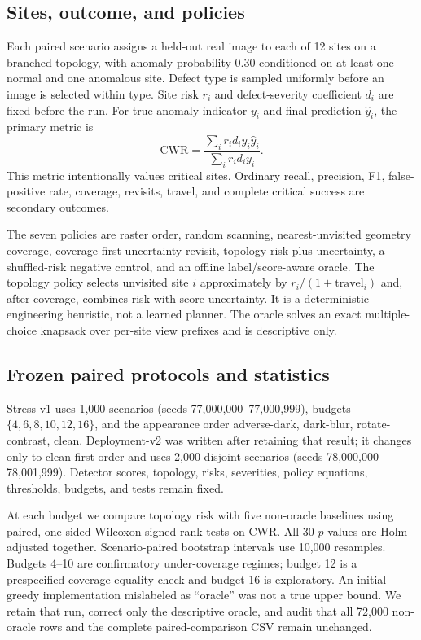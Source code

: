 \documentclass[journal]{IEEEtran}
\begin{document}
\subsection{Sites, outcome, and policies}

Each paired scenario assigns a held-out real image to each of 12 sites on a
branched topology, with anomaly probability 0.30 conditioned on at least one
normal and one anomalous site.  Defect type is sampled uniformly before an
image is selected within type.  Site risk $r_i$ and defect-severity coefficient
$d_i$ are fixed before the run.  For true anomaly indicator $y_i$ and final
prediction $\hat y_i$, the primary metric is
\begin{equation}
 \mathrm{CWR}=\frac{\sum_i r_i d_i y_i\hat y_i}
                    {\sum_i r_i d_i y_i}.
\end{equation}
This metric intentionally values critical sites.  Ordinary recall, precision,
F1, false-positive rate, coverage, revisits, travel, and complete critical
success are secondary outcomes.

The seven policies are raster order, random scanning, nearest-unvisited geometry
coverage, coverage-first uncertainty revisit, topology risk plus uncertainty,
a shuffled-risk negative control, and an offline label/score-aware oracle.  The
topology policy selects unvisited site $i$ approximately by
$r_i/(1+\mathrm{travel}_i)$ and, after coverage, combines risk with score
uncertainty.  It is a deterministic engineering heuristic, not a learned
planner.  The oracle solves an exact multiple-choice knapsack over per-site view
prefixes and is descriptive only.

\subsection{Frozen paired protocols and statistics}

Stress-v1 uses 1,000 scenarios (seeds 77,000,000--77,000,999), budgets
$\{4,6,8,10,12,16\}$, and the appearance order adverse-dark, dark-blur,
rotate-contrast, clean.  Deployment-v2 was written after retaining that result;
it changes only to clean-first order and uses 2,000 disjoint scenarios (seeds
78,000,000--78,001,999).  Detector scores, topology, risks, severities, policy
equations, thresholds, budgets, and tests remain fixed.

At each budget we compare topology risk with five non-oracle baselines using
paired, one-sided Wilcoxon signed-rank tests on CWR.  All 30 $p$-values are Holm
adjusted together.  Scenario-paired bootstrap intervals use 10,000 resamples.
Budgets 4--10 are confirmatory under-coverage regimes; budget 12 is a
prespecified coverage equality check and budget 16 is exploratory.  An initial
greedy implementation mislabeled as ``oracle'' was not a true upper bound.  We
retain that run, correct only the descriptive oracle, and audit that all 72,000
non-oracle rows and the complete paired-comparison CSV remain unchanged.
\end{document}
